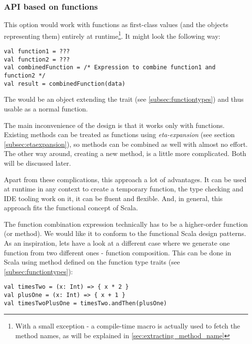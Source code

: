 \subsubsection{API based on functions}

This option would work with functions as first-class values (and the objects representing them) entirely at runtime\footnote{With a small exception - a compile-time macro is actually used to fetch the method names, as will be explained in \ref{sec:extracting_method_name}}. It might look the following way:

\lstset{style=Scala}
\begin{lstlisting}
val function1 = ???
val function2 = ???
val combinedFunction = /* Expression to combine function1 and function2 */
val result = combinedFunction(data)
\end{lstlisting}

The  would be an object extending the  trait (see \ref{subsec:functiontypes}) and thus usable as a normal function.

The main inconvenience of the design is that it works only with functions. Existing methods can be treated as functions using \textit{eta-expansion} (see section \ref{subsec:etaexpansion}), so methods can be combined as well with almost no effort. The other way around, creating a new method, is a little more complicated. Both will be discussed later.

Apart from these complications, this approach a lot of advantages. It can be used at runtime in any context to create a temporary function, the type checking and IDE tooling work on it, it can be fluent and flexible. And, in general, this approach fits the functional concept of Scala.

The function combination expression technically has to be a higher-order function (or method). We would like it to conform to the functional Scala design patterns. As an inspiration, lets have a look at a different case where we generate one function from two different ones - function composition. This can be done in Scala using  method defined on the function type traits (see \ref{subsec:functiontypes}):

\lstset{style=Scala}
\begin{lstlisting}
val timesTwo = (x: Int) => { x * 2 }
val plusOne = (x: Int) => { x + 1 }
val timesTwoPlusOne = timesTwo.andThen(plusOne)
\end{lstlisting}

